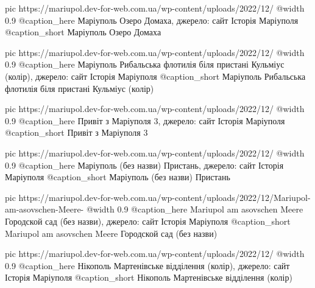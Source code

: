   pic https://mariupol.dev-for-web.com.ua/wp-content/uploads/2022/12/%
  @width 0.9
  @caption_here Маріуполь Озеро Домаха, джерело: сайт Історія Маріуполя
  @caption_short Маріуполь Озеро Домаха

  pic https://mariupol.dev-for-web.com.ua/wp-content/uploads/2022/12/%
  @width 0.9
  @caption_here Маріуполь Рибальська флотилія біля пристані Кульміус (колір), джерело: сайт Історія Маріуполя
  @caption_short Маріуполь Рибальська флотилія біля пристані Кульміус (колір)

  pic https://mariupol.dev-for-web.com.ua/wp-content/uploads/2022/12/%
  @width 0.9
  @caption_here Привіт з Маріуполя 3, джерело: сайт Історія Маріуполя
  @caption_short Привіт з Маріуполя 3

  pic https://mariupol.dev-for-web.com.ua/wp-content/uploads/2022/12/%
  @width 0.9
  @caption_here Маріуполь (без назви) Пристань, джерело: сайт Історія Маріуполя
  @caption_short Маріуполь (без назви) Пристань

  pic https://mariupol.dev-for-web.com.ua/wp-content/uploads/2022/12/Mariupol-am-asovschen-Meere-%
  @width 0.9
  @caption_here Mariupol am asovschen Meere Городской сад (без назви), джерело: сайт Історія Маріуполя
  @caption_short Mariupol am asovschen Meere Городской сад (без назви)

  pic https://mariupol.dev-for-web.com.ua/wp-content/uploads/2022/12/%
  @width 0.9
  @caption_here Нікополь Мартенівське відділення (колір), джерело: сайт Історія Маріуполя
  @caption_short Нікополь Мартенівське відділення (колір)

